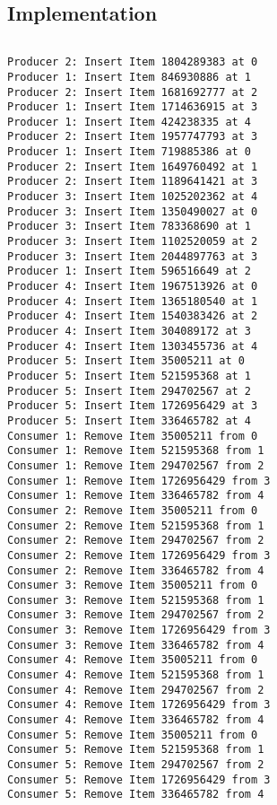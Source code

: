 \subsection{Implementation}

\inputminted[fontsize=\footnotesize,linenos,autogobble]{c}{code/producer_consumer.c}

\begin{lstlisting}[style=output]
Producer 2: Insert Item 1804289383 at 0
Producer 1: Insert Item 846930886 at 1
Producer 2: Insert Item 1681692777 at 2
Producer 1: Insert Item 1714636915 at 3
Producer 1: Insert Item 424238335 at 4
Producer 2: Insert Item 1957747793 at 3
Producer 1: Insert Item 719885386 at 0
Producer 2: Insert Item 1649760492 at 1
Producer 2: Insert Item 1189641421 at 3
Producer 3: Insert Item 1025202362 at 4
Producer 3: Insert Item 1350490027 at 0
Producer 3: Insert Item 783368690 at 1
Producer 3: Insert Item 1102520059 at 2
Producer 3: Insert Item 2044897763 at 3
Producer 1: Insert Item 596516649 at 2
Producer 4: Insert Item 1967513926 at 0
Producer 4: Insert Item 1365180540 at 1
Producer 4: Insert Item 1540383426 at 2
Producer 4: Insert Item 304089172 at 3
Producer 4: Insert Item 1303455736 at 4
Producer 5: Insert Item 35005211 at 0
Producer 5: Insert Item 521595368 at 1
Producer 5: Insert Item 294702567 at 2
Producer 5: Insert Item 1726956429 at 3
Producer 5: Insert Item 336465782 at 4
Consumer 1: Remove Item 35005211 from 0
Consumer 1: Remove Item 521595368 from 1
Consumer 1: Remove Item 294702567 from 2
Consumer 1: Remove Item 1726956429 from 3
Consumer 1: Remove Item 336465782 from 4
Consumer 2: Remove Item 35005211 from 0
Consumer 2: Remove Item 521595368 from 1
Consumer 2: Remove Item 294702567 from 2
Consumer 2: Remove Item 1726956429 from 3
Consumer 2: Remove Item 336465782 from 4
Consumer 3: Remove Item 35005211 from 0
Consumer 3: Remove Item 521595368 from 1
Consumer 3: Remove Item 294702567 from 2
Consumer 3: Remove Item 1726956429 from 3
Consumer 3: Remove Item 336465782 from 4
Consumer 4: Remove Item 35005211 from 0
Consumer 4: Remove Item 521595368 from 1
Consumer 4: Remove Item 294702567 from 2
Consumer 4: Remove Item 1726956429 from 3
Consumer 4: Remove Item 336465782 from 4
Consumer 5: Remove Item 35005211 from 0
Consumer 5: Remove Item 521595368 from 1
Consumer 5: Remove Item 294702567 from 2
Consumer 5: Remove Item 1726956429 from 3
Consumer 5: Remove Item 336465782 from 4
\end{lstlisting}